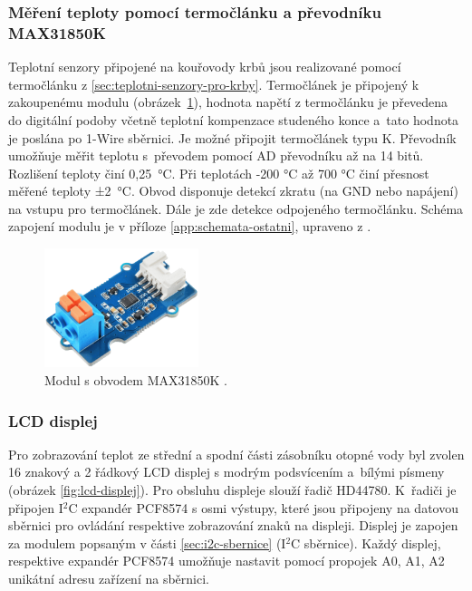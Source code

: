 \subsubsection{Měření teploty pomocí termočlánku a převodníku MAX31850K}
Teplotní senzory připojené na kouřovody krbů jsou realizované pomocí termočlánku z \ref{sec:teplotni-senzory-pro-krby}. Termočlánek je připojený k zakoupenému modulu (obrázek~\ref{fig:modul-max31850k-1-wire-prevodnik-termoclanku}), hodnota napětí z termočlánku je převedena do digitální podoby včetně teplotní kompenzace studeného konce a~tato hodnota je poslána po 1-Wire sběrnici. Je možné připojit termočlánek typu K. Převodník umožňuje měřit teplotu s~převodem pomocí AD převodníku až na 14 bitů. Rozlišení teploty činí 0,25~°C. Při teplotách -200 °C až 700 °C činí přesnost měřené teploty ±2~°C. Obvod disponuje detekcí zkratu (na GND nebo napájení) na vstupu pro termočlánek. Dále je zde detekce odpojeného termočlánku. Schéma zapojení modulu je v příloze \ref{app:schemata-ostatni}, upraveno z \cite{prevodnik-max31850k}.


\begin{figure}[H]
    \centering
    \includegraphics[width=0.4\textwidth]{images/krb/modul-max31850k-1-wire-prevodnik-termoclanku.png}
    \caption[Modul s obvodem MAX31850K.]{Modul s obvodem MAX31850K \cite{prevodnik-max31850k}.}
    \label{fig:modul-max31850k-1-wire-prevodnik-termoclanku}
\end{figure}

\subsubsection{LCD displej}
Pro zobrazování teplot ze střední a spodní části zásobníku otopné vody byl zvolen 16 znakový a 2 řádkový LCD displej s modrým podsvícením a~bílými písmeny (obrázek \ref{fig:lcd-displej}). Pro obsluhu displeje slouží řadič HD44780. K~řadiči je připojen I$^2$C expandér PCF8574 s osmi výstupy, které jsou připojeny na datovou sběrnici pro ovládání respektive zobrazování znaků na displeji. Displej je zapojen za modulem popsaným v části \ref{sec:i2c-sbernice} (I$^2$C sběrnice). Každý displej, respektive expandér PCF8574 umožňuje nastavit pomocí propojek A0, A1, A2 unikátní adresu zařízení na sběrnici.

